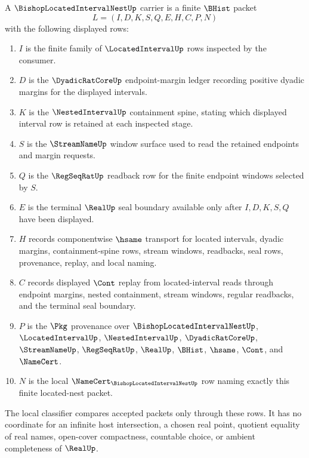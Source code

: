 \begin{definition}
\label{def:bishop-located-interval-nest-carrier}
A $\BishopLocatedIntervalNestUp$ carrier is a finite $\BHist$ packet
$$
L=(I,D,K,S,Q,E,H,C,P,N)
$$
with the following displayed rows:
\begin{enumerate}
\item $I$ is the finite family of $\LocatedIntervalUp$ rows inspected by the consumer.
\item $D$ is the $\DyadicRatCoreUp$ endpoint-margin ledger recording positive dyadic margins for the displayed intervals.
\item $K$ is the $\NestedIntervalUp$ containment spine, stating which displayed interval row is retained at each inspected stage.
\item $S$ is the $\StreamNameUp$ window surface used to read the retained endpoints and margin requests.
\item $Q$ is the $\RegSeqRatUp$ readback row for the finite endpoint windows selected by $S$.
\item $E$ is the terminal $\RealUp$ seal boundary available only after $I,D,K,S,Q$ have been displayed.
\item $H$ records componentwise $\hsame$ transport for located intervals, dyadic margins, containment-spine rows, stream windows, readbacks, seal rows, provenance, replay, and local naming.
\item $C$ records displayed $\Cont$ replay from located-interval reads through endpoint margins, nested containment, stream windows, regular readbacks, and the terminal seal boundary.
\item $P$ is the $\Pkg$ provenance over $\BishopLocatedIntervalNestUp$, $\LocatedIntervalUp$, $\NestedIntervalUp$, $\DyadicRatCoreUp$, $\StreamNameUp$, $\RegSeqRatUp$, $\RealUp$, $\BHist$, $\hsame$, $\Cont$, and $\NameCert$.
\item $N$ is the local $\NameCert_{\BishopLocatedIntervalNestUp}$ row naming exactly this finite located-nest packet.
\end{enumerate}
The local classifier compares accepted packets only through these rows. It has no coordinate for an infinite host intersection, a chosen real point, quotient equality of real names, open-cover compactness, countable choice, or ambient completeness of $\RealUp$.
\end{definition}

